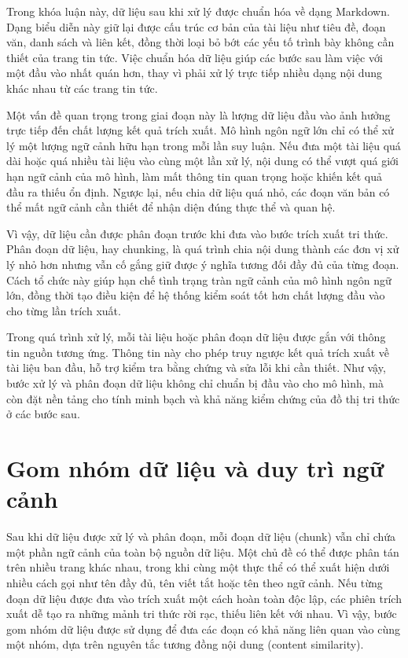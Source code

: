 Trong khóa luận này, dữ liệu sau khi xử lý được chuẩn hóa về dạng Markdown. Dạng biểu diễn này giữ lại được cấu trúc cơ bản của tài liệu như tiêu đề, đoạn văn, danh sách và liên kết, đồng thời loại bỏ bớt các yếu tố trình bày không cần thiết của trang tin tức. Việc chuẩn hóa dữ liệu giúp các bước sau làm việc với một đầu vào nhất quán hơn, thay vì phải xử lý trực tiếp nhiều dạng nội dung khác nhau từ các trang tin tức.

Một vấn đề quan trọng trong giai đoạn này là lượng dữ liệu đầu vào ảnh hưởng trực tiếp đến chất lượng kết quả trích xuất. Mô hình ngôn ngữ lớn chỉ có thể xử lý một lượng ngữ cảnh hữu hạn trong mỗi lần suy luận. Nếu đưa một tài liệu quá dài hoặc quá nhiều tài liệu vào cùng một lần xử lý, nội dung có thể vượt quá giới hạn ngữ cảnh của mô hình, làm mất thông tin quan trọng hoặc khiến kết quả đầu ra thiếu ổn định. Ngược lại, nếu chia dữ liệu quá nhỏ, các đoạn văn bản có thể mất ngữ cảnh cần thiết để nhận diện đúng thực thể và quan hệ.

Vì vậy, dữ liệu cần được phân đoạn trước khi đưa vào bước trích xuất tri thức. Phân đoạn dữ liệu, hay chunking, là quá trình chia nội dung thành các đơn vị xử lý nhỏ hơn nhưng vẫn cố gắng giữ được ý nghĩa tương đối đầy đủ của từng đoạn. Cách tổ chức này giúp hạn chế tình trạng tràn ngữ cảnh của mô hình ngôn ngữ lớn, đồng thời tạo điều kiện để hệ thống kiểm soát tốt hơn chất lượng đầu vào cho từng lần trích xuất.

Trong quá trình xử lý, mỗi tài liệu hoặc phân đoạn dữ liệu được gắn với thông tin nguồn tương ứng. Thông tin này cho phép truy ngược kết quả trích xuất về tài liệu ban đầu, hỗ trợ kiểm tra bằng chứng và sửa lỗi khi cần thiết. Như vậy, bước xử lý và phân đoạn dữ liệu không chỉ chuẩn bị đầu vào cho mô hình, mà còn đặt nền tảng cho tính minh bạch và khả năng kiểm chứng của đồ thị tri thức ở các bước sau.

\section{Gom nhóm dữ liệu và duy trì ngữ cảnh}

Sau khi dữ liệu được xử lý và phân đoạn, mỗi đoạn dữ liệu (chunk) vẫn chỉ chứa một phần ngữ cảnh của toàn bộ nguồn dữ liệu. Một chủ đề có thể được phân tán trên nhiều trang khác nhau, trong khi cùng một thực thể có thể xuất hiện dưới nhiều cách gọi như tên đầy đủ, tên viết tắt hoặc tên theo ngữ cảnh. Nếu từng đoạn dữ liệu được đưa vào trích xuất một cách hoàn toàn độc lập, các phiên trích xuất dễ tạo ra những mảnh tri thức rời rạc, thiếu liên kết với nhau. Vì vậy, bước gom nhóm dữ liệu được sử dụng để đưa các đoạn có khả năng liên quan vào cùng một nhóm, dựa trên nguyên tắc tương đồng nội dung (content similarity).

